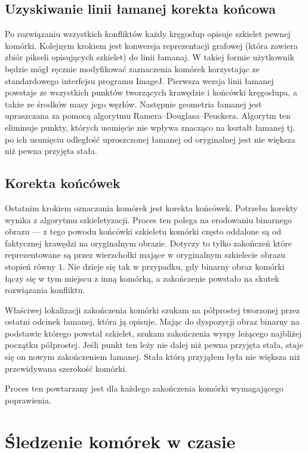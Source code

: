 \documentclass[declaration,shortabstract,mgr]{iithesis}
\begin{document}
\subsection{Uzyskiwanie linii łamanej korekta końcowa}

Po rozwiązaniu wszystkich konfliktów każdy kręgosłup opisuje szkielet pewnej komórki.
Kolejnym krokiem jest konwersja reprezentacji grafowej (która zawiera zbiór pikseli opisujących szkielet) do linii łamanaj.
W takiej formie użytkownik będzie mógł ręcznie modyfikować zaznaczenia komórek korzystając ze standardowego interfejsu programu ImageJ.
Pierwsza wersja linii łamanej powstaje ze wszystkich punktów tworzących krawędzie i końcówki kręgosłupa, a także ze środków masy jego węzłów.
Następnie geometria łamanej jest upraszczana za pomocą algorytmu Ramera--Douglasa--Peuckera\cite{algo:ramer-douglas-peucker}.
Algorytm ten eliminuje punkty, których usunięcie nie wpływa znacząco na kształt łamanej tj. po ich usunięciu odległość uproszczonej łamanej od oryginalnej jest nie większa niż pewna przyjęta stała.

\subsection{Korekta końcówek}
\label{sec:correct-endpoints}

Ostatnim krokiem oznaczania komórek jest korekta końcówek.
Potrzeba korekty wynika z algorytmu szkieletyzacji.
Proces ten polega na erodowaniu binarnego obrazu --- z tego powodu końcówki szkieletu komórki często oddalone są od faktycznej krawędzi na oryginalnym obrazie.
Dotyczy to tylko zakończeń które reprezentowane są przez wierzchołki mające w oryginalnym szkielecie obrazu stopień równy $1$.
Nie dzieje się tak w przypadku, gdy binarny obraz komórki łączy się w tym miejscu z inną komórką, a zakończenie powstało na skutek rozwiązania konfliktu.

Właściwej lokalizacji zakończenia komórki szukam na półprostej tworzonej przez ostatni odcinek łamanej, która ją opisuje.
Mając do dyspozycji obraz binarny na podstawie którego powstał szkielet, szukam zakończenia wyspy leżącego najbliżej początku półprostej.
Jeśli punkt ten leży nie dalej niż pewna przyjęta stała, staje się on nowym zakończeniem łamanej.
Stała którą przyjąłem była nie większa niż przewidywana szerokość komórki.

Proces ten powtarzany jest dla każdego zakończenia komórki wymagającego poprawienia.

\section{Śledzenie komórek w czasie}
\label{sec:cell-tracking}
\end{document}
